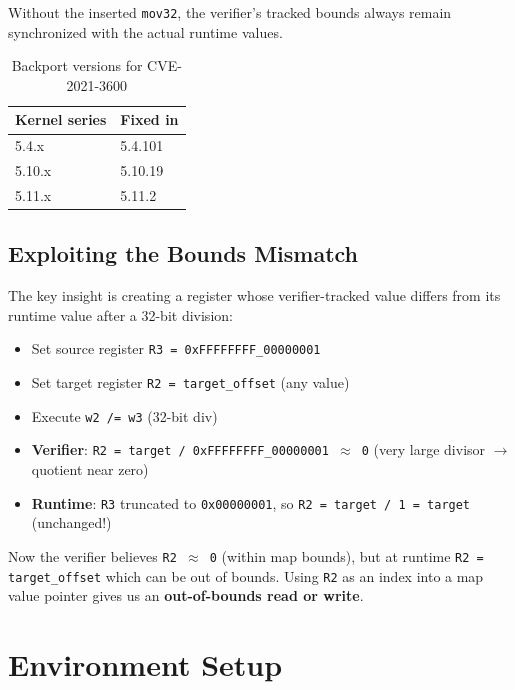 Without the inserted \texttt{mov32}, the verifier's tracked bounds always remain synchronized with the actual runtime values.

\begin{table}[H]
\centering
\begin{tabular}{@{}ll@{}}
\toprule
\textbf{Kernel series} & \textbf{Fixed in} \\
\midrule
5.4.x & 5.4.101 \\
5.10.x & 5.10.19 \\
5.11.x & 5.11.2 \\
\bottomrule
\end{tabular}
\caption{Backport versions for CVE-2021-3600}
\end{table}

\subsection{Exploiting the Bounds Mismatch}

The key insight is creating a register whose verifier-tracked value differs from its runtime value after a 32-bit division:

\begin{itemize}
    \item Set source register \texttt{R3 = 0xFFFFFFFF\_00000001}
    \item Set target register \texttt{R2 = target\_offset} (any value)
    \item Execute \texttt{w2 /= w3} (32-bit div)
    \item \textbf{Verifier}: \texttt{R2 = target / 0xFFFFFFFF\_00000001 $\approx$ 0} (very large divisor $\rightarrow$ quotient near zero)
    \item \textbf{Runtime}: \texttt{R3} truncated to \texttt{0x00000001}, so \texttt{R2 = target / 1 = target} (unchanged!)
\end{itemize}

Now the verifier believes \texttt{R2 $\approx$ 0} (within map bounds), but at runtime \texttt{R2 = target\_offset} which can be out of bounds. Using \texttt{R2} as an index into a map value pointer gives us an \textbf{out-of-bounds read or write}.


\section{Environment Setup}

